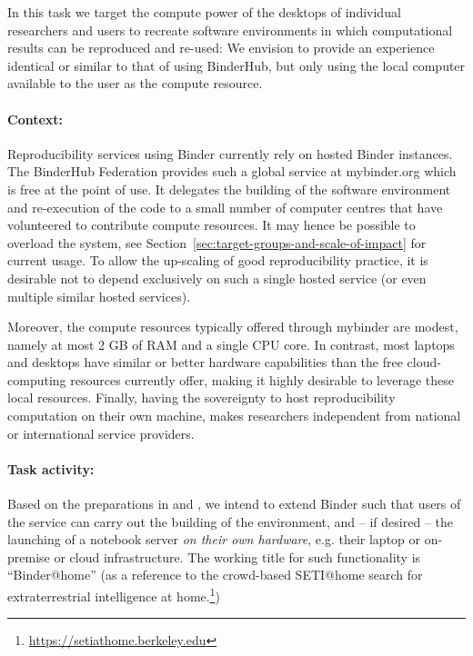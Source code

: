 \begin{task}[
  title=Binder@home,
  id=binder-at-home,
  lead=SRL,
  PM=7,
  partners={MP,UIO,IFR}
]
In this task we target the compute power of the desktops of individual researchers and
users to recreate software environments in which computational results can be
reproduced and re-used: We envision to provide an experience identical or similar
to that of using BinderHub, but only using the local computer available to the
user as the compute resource.

\paragraph*{Context:} Reproducibility services using Binder currently rely on hosted Binder instances.
The BinderHub Federation provides such a global service at mybinder.org
which is free at
the point of use. It delegates the building of the software environment and
re-execution of the code to a small number of computer centres that have
volunteered to contribute compute resources.
It may hence be possible to overload the system, see
Section~\ref{sec:target-groups-and-scale-of-impact} for current usage.
To allow the up-scaling of good reproducibility practice, it is 
desirable not to depend exclusively on such a single hosted service (or even multiple similar hosted services).

Moreover, the compute resources typically offered through mybinder are modest, namely at most 2 GB of RAM
and a single CPU core.
In contrast, most laptops and desktops have similar or better hardware capabilities than
the free \mybinder{} cloud-computing resources currently offer, making it highly desirable to leverage these local resources.
Finally, having the sovereignty to host reproducibility computation on their own
machine, makes researchers independent from national or international service providers. 

\paragraph*{Task activity:} Based on the preparations in  and
, we intend to extend Binder such that users of the service can
carry out the building of the environment, and -- if desired -- the launching of a
notebook server \emph{on their own hardware}, e.g. their laptop or on-premise or cloud infrastructure.
The working title for such
functionality is ``Binder@home'' (as a reference to the crowd-based SETI@home search for
extraterrestrial intelligence at home.\footnote{\url{https://setiathome.berkeley.edu}})


\end{task}
